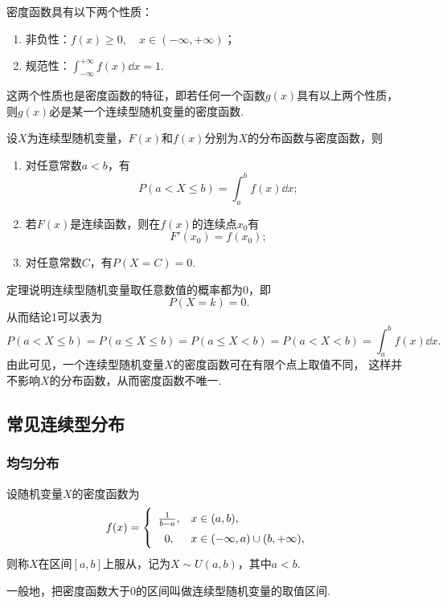 \begin{property}\label{theorem:随机变量及其分布.连续型随机变量的密度函数的性质}
密度函数具有以下两个性质：
\begin{enumerate}
\item 非负性：\(f(x) \geqslant 0, \quad x \in (-\infty,+\infty)\)；
\item 规范性：\(\int_{-\infty}^{+\infty} f(x) \dd{x} = 1\).
\end{enumerate}
\rm
这两个性质也是密度函数的特征，即若任何一个函数\(g(x)\)具有以上两个性质，%
则\(g(x)\)必是某一个连续型随机变量的密度函数.
\end{property}

\begin{theorem}
设\(X\)为连续型随机变量，\(F(x)\)和\(f(x)\)分别为\(X\)的分布函数与密度函数，则
\begin{enumerate}
\item 对任意常数\(a < b\)，有\[
P(a < X \leqslant b) = \int_a^b{f(x) \dd{x}};
\]
\item 若\(F(x)\)是连续函数，则在\(f(x)\)的连续点\(x_0\)有\[
F'(x_0) = f(x_0);
\]
\item 对任意常数\(C\)，有\(P(X=C) = 0\).
\end{enumerate}
\end{theorem}

定理说明连续型随机变量取任意数值的概率都为0，即\[
P(X=k) = 0.
\]从而结论1可以表为\[
P(a < X \leqslant b)
= P(a \leqslant X \leqslant b)
= P(a \leqslant X < b)
= P(a < X < b)
= \int_a^b{f(x) \dd{x}}.
\]
由此可见，一个连续型随机变量\(X\)的密度函数可在有限个点上取值不同，%
这样并不影响\(X\)的分布函数，从而密度函数不唯一.

\subsection{常见连续型分布}

\subsubsection{均匀分布}
\begin{definition}
设随机变量\(X\)的密度函数为\begin{equation}
f(x) = \left\{ \def\arraystretch{1.5}
\begin{array}{cl}
\frac{1}{b-a}, & x \in (a,b), \\
0, & x \in (-\infty,a) \cup (b,+\infty), \\
\end{array} \right.
\end{equation}则称\(X\)在区间\([a,b]\)上服从，记为\(X \sim U(a,b)\)，其中\(a < b\).

一般地，把密度函数大于0的区间叫做连续型随机变量的取值区间.
\end{definition}


